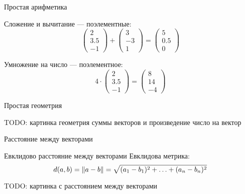 \documentclass[14pt,xcolor=dvipsnames]{beamer}
\begin{document}
\begin{frame}{Простая арифметика}

  \begin{block}{Сложение и вычитание — поэлементные:}
    \[
    \begin{pmatrix}
      2 \\
      3.5 \\
      -1 
    \end{pmatrix} + \begin{pmatrix}
      3 \\
      -3 \\
      1 
    \end{pmatrix}  = \begin{pmatrix}
      5 \\
      0.5 \\
      0 
    \end{pmatrix}
    \]  
  \end{block}
  
  \begin{block}{Умножение на число — поэлементное:}
    \[
    4 \cdot \begin{pmatrix}
      2 \\
      3.5 \\
      -1 
    \end{pmatrix} = \begin{pmatrix}
      8 \\
      14 \\
      -4 
    \end{pmatrix}  
    \]
  \end{block}
  
  
  \end{frame}

  

\begin{frame}{Простая геометрия}

\begin{block}{TODO: картинка}
геометрия суммы векторов и произведение число на вектор
\end{block}


\end{frame}




\begin{frame}{Расстояние между векторами}

\begin{block}{Евклидово расстояние между векторами}
  Евклидова метрика:
  \[
  d(a, b) = \norm{a - b} = \sqrt{(a_1 - b_1)^2 + \ldots + (a_n - b_n)^2}
  \]
\end{block}

\begin{block}{TODO: картинка с расстоянием между векторами}

\end{block}


\end{frame}
\end{document}
